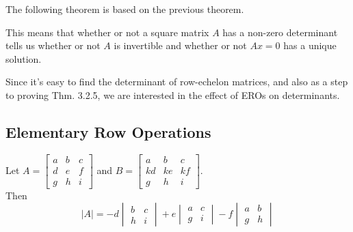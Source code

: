 \documentclass[oneside]{book}
\begin{document}
The following theorem is based on the previous theorem.


This means that whether or not a square matrix $A$ has a non-zero determinant tells us whether or not $A$ is invertible and whether or not $Ax=0$ has a unique solution.





Since it’s easy to find the determinant of row-echelon matrices, and also as a step to proving Thm. 3.2.5, we are interested in the effect of EROs on determinants.


\subsection{Elementary Row Operations}



Let $A  = \begin{bmatrix}
    a & b & c\\
    d & e & f\\
    g & h & i
\end{bmatrix}$ and $B = \begin{bmatrix}
    a & b & c\\
    kd & ke & kf\\
    g & h & i
\end{bmatrix}$. \\
Then 
\\
\[
    \mid A \mid = -d \begin{vmatrix}
        b & c\\
        h & i
    \end{vmatrix} + e \begin{vmatrix}
        a & c\\
        g & i
    \end{vmatrix} - f \begin{vmatrix}
        a & b\\
        g & h
    \end{vmatrix}
\]
\end{document}
